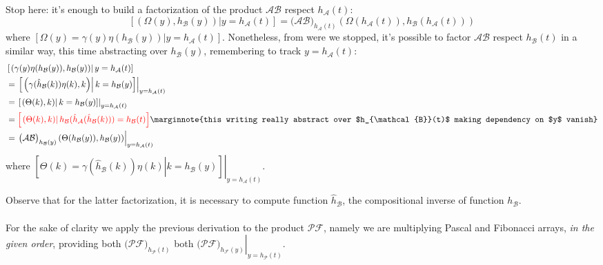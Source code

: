 Stop here: it's enough to build a factorization of the product $\mathcal{A}\mathcal{B}$ 
respect $h_{\mathcal{A}}(t)$:
\begin{displaymath}
        \left[\left.\left(\Omega(y), h_{\mathcal{B}}(y)  \right) \right| y=h_{\mathcal{A}}(t) \right] 
        =\big(\mathcal{A}\mathcal{B}\big)_{h_{\mathcal{A}}(t)}\left(
            \Omega(h_{\mathcal{A}}(t)), h_{\mathcal{B}}(h_{\mathcal{A}}(t))  \right)
\end{displaymath}
where $\left[\Omega(y)= \gamma(y)\eta(h_{\mathcal{B}}(y))| y=h_{\mathcal{A}}(t) \right]$. 
Nonetheless, from were we stopped, it's possible to factor $\mathcal{A}\mathcal{B}$ respect $h_{\mathcal{B}}(t)$ in
a similar way, this time abstracting over $h_{\mathcal{B}}(y)$, remembering to track $y=h_{\mathcal{A}}(t)$:
\begin{displaymath}
    \begin{split}
        &\left[\left.\left(\gamma(y)\eta(h_{\mathcal{B}}(y)), h_{\mathcal{B}}(y)  \right) \right|
             y=h_{\mathcal{A}}(t) \right]\\
        &=\left.\left[\left.\left(\gamma(\hat{h}_{\mathcal{B}}(k))\eta(k), k  \right) \right|
             k=h_{\mathcal{B}}(y) \right]\right|_{y=h_{\mathcal{A}}(t)}\\
        &=\left.\left[\left.\left(\Theta(k), k  \right) \right| k=h_{\mathcal{B}}(y) \right]\right|_{y=h_{\mathcal{A}}(t)}\\
        &=\textcolor{red}{\left[\left.\left(\Theta(k), k  \right) \right| 
            h_{\mathcal{B}}(\hat{h}_{\mathcal{A}}(\hat{h}_{\mathcal{B}}(k)))=h_{\mathcal{B}}(t) \right]} 
            \marginnote{this writing really abstract over $h_{\mathcal{B}}(t)$ making dependency on $y$ vanish}\\
        &=\left.\big(\mathcal{A}\mathcal{B}\big)_{h_{\mathcal{B}}(y)}\left(
            \Theta(h_{\mathcal{B}}(y)), h_{\mathcal{B}}(y)  \right)\right|_{y=h_{\mathcal{A}}(t)}
    \end{split}
\end{displaymath}
where $\left.\left[\left.\Theta(k)=\gamma(\hat{h}_{\mathcal{B}}(k))\eta(k) \right| 
    k=h_{\mathcal{B}}(y) \right]\right|_{y=h_{\mathcal{A}}(t)}$.

Observe that for the latter factorization, it is necessary to compute function $\hat{h}_{\mathcal{B}}$, 
the compositional inverse of function $h_{\mathcal{B}}$.
\\\\
For the sake of clarity we apply the previous derivation to the product $\mathcal{P}\mathcal{F}$, namely
we are multiplying Pascal and Fibonacci arrays, \emph{in the given order}, providing 
both $\big(\mathcal{P}\mathcal{F}\big)_{h_{\mathcal{P}}(t)}$ 
both $\left.\big(\mathcal{P}\mathcal{F}\big)_{h_{\mathcal{F}}(y)}\right|_{y=h_{\mathcal{P}}(t)}$.

